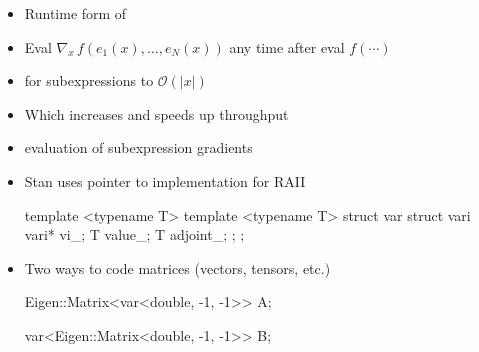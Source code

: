 \documentclass[10pt]{report}
\begin{document}
\begin{itemize}
\item Runtime form of 
\item Eval $\nabla_{x} \, f(e_1(x), \ldots, e_N(x))$ any time after
  eval $f(\cdots)$
\item {} for subexpressions to $\mathcal{O}(|x|)$
\item Which increases  and speeds up throughput
\item {} evaluation of subexpression gradients
\end{itemize}

\begin{itemize}
  \item Stan uses pointer to implementation for RAII
\begin{stancode}
template <typename T>   template <typename T>
struct var {            struct vari {
  vari* vi_;              T value_;  T adjoint_;
};                      };
\end{stancode}
%
\item Two ways to code matrices (vectors, tensors, etc.)
\begin{stancode}
Eigen::Matrix<var<double, -1, -1>> A;
\end{stancode}
\begin{stancode}
var<Eigen::Matrix<double, -1, -1>> B;
\end{stancode}
\end{itemize}
\end{document}
